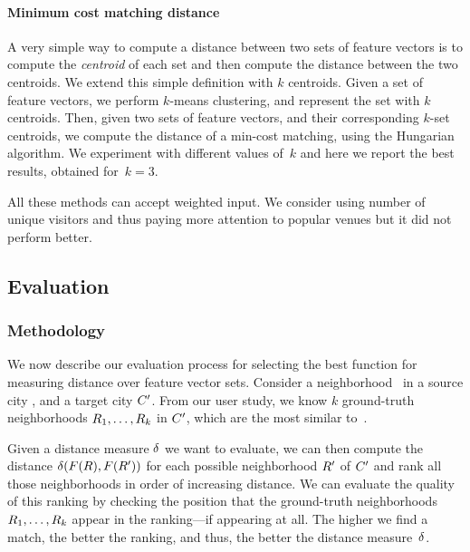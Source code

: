 \paragraph{Minimum cost matching distance}
A very simple way to compute a distance between two sets of feature vectors is
to compute the \emph{centroid} of each set and then compute the distance
between the two centroids.  We extend this simple definition with $k$
centroids.  Given a set of feature vectors, we perform $k$-means clustering,
and represent the set with $k$ centroids.  Then, given two sets of feature
vectors, and their corresponding $k$-set centroids, we compute the distance of
a min-cost matching, using the Hungarian algorithm.  We experiment with
different values of~$k$ and here we report the best results, obtained
for~$k=3$.

\bigskip

All these methods can accept weighted input. We consider using number of unique
visitors and thus paying more attention to popular venues but it did not
perform better.

\subsection{Evaluation}
\label{sub:region-evaluation}

\subsubsection{Methodology}
We now describe our evaluation process for selecting the best function for
measuring distance over feature vector sets. 
Consider a neighborhood \region\ in a source city \city, and a target city
${C}'$.
From our user study, we know $k$ ground-truth neighborhoods
${R}_1,\ldots,{R}_k$ in ${C}'$, which are the most 
similar to~\region.

Given a distance measure ${\delta}$ we want to evaluate, 
we can then compute the distance
${\delta}({F}({R}),{F}({R}'))$ for each possible
neighborhood ${R}'$ of ${C}'$ and rank all those neighborhoods
in order of increasing distance. 
We can evaluate the quality of this ranking by checking the position
that the ground-truth neighborhoods ${R}_1,\ldots,{R}_k$
appear in the ranking---if appearing at all. 
The higher we find a match, the better the ranking, and thus, the
better the distance measure~${\delta}$.

